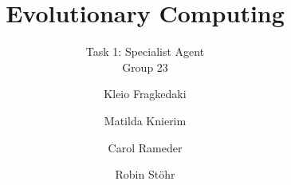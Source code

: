 \documentclass[sigconf]{acmart}
\begin{document}
\title{Evolutionary Computing}   
\subtitle{Task 1: Specialist Agent \\ Group 23}


\author{Kleio Fragkedaki}
\author{Matilda Knierim}

\author{Carol Rameder}

\author{Robin Stöhr}


%
%


\maketitle








%
\clearpage
%
%
%
\printbibliography
\end{document}
